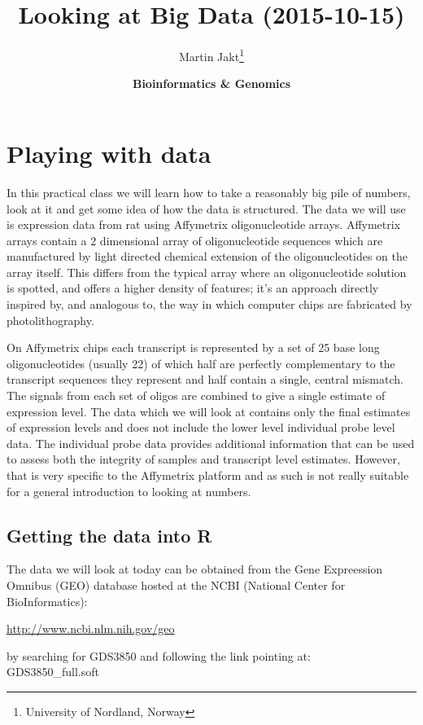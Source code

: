 \documentclass[11pt]{article}
\author{Martin Jakt\thanks{University of Nordland, Norway}}
\date{\textbf{Bioinformatics \& Genomics}}
\title{\textbf{Looking at Big Data} (2015-10-15)}
\begin{document}
\maketitle

\section{Playing with data}
\label{sec-1}
In this practical class we will learn how to take a reasonably
big pile of numbers, look at it and get some idea of how the
data is structured. The data we will use is expression data from
rat using Affymetrix oligonucleotide arrays. Affymetrix arrays contain
a 2 dimensional array of oligonucleotide sequences which are manufactured
by light directed chemical extension of the oligonucleotides on the
array itself. This differs from the typical array where an oligonucleotide
solution is spotted, and offers a higher density of features; it's
an approach directly inspired by, and analogous to, the way in which
computer chips are fabricated by photolithography.

On Affymetrix chips each transcript is represented by a set of 25 base
long oligonucleotides (usually 22) of which half are perfectly 
complementary to the transcript sequences they represent and half contain
a single, central mismatch. The signals from each set of oligos
are combined to give a single estimate of expression level. The data which
we will look at contains only the final estimates of expression levels and
does not include the lower level individual probe level data. The individual
probe data provides additional information that can be used to assess both
the integrity of samples and transcript level estimates. However, that
is very specific to the Affymetrix platform and as such is not really
suitable for a general introduction to looking at numbers.

\subsection{Getting the data into R}
\label{sec-1-1}
The data we will look at today can be obtained from the
Gene Expreession Omnibus (GEO) database hosted at the
NCBI (National Center for BioInformatics):

\url{http://www.ncbi.nlm.nih.gov/geo}

by searching for GDS3850 and following the link pointing at:\\
GDS3850\_full.soft\\
\end{document}
